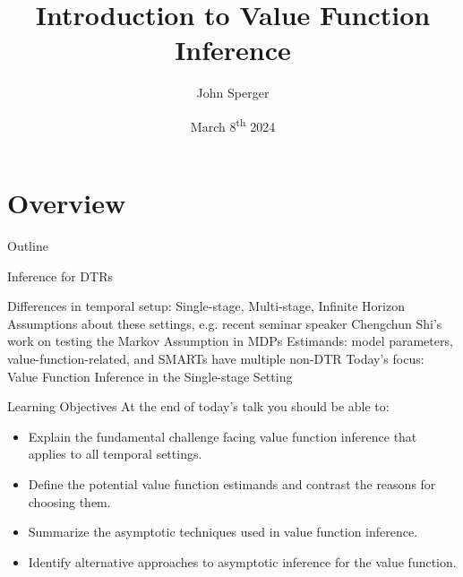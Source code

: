 \documentclass[aspectratio=169, professionalfonts]{beamer}
\author{John Sperger}
\date{March 8\textsuperscript{th} 2024}
\title{Introduction to Value Function Inference}
\begin{document}
\maketitle

\section{Overview}
\begin{frame}{Outline}
	\tableofcontents[hideallsubsections]
\end{frame}

\begin{frame}[label={overview:time}]{Inference for DTRs}

	Differences in temporal setup: Single-stage, Multi-stage, Infinite Horizon
	\vfill
	Assumptions about these settings, e.g. recent seminar speaker Chengchun
	Shi's work on testing the Markov Assumption in MDPs
	\vfill
	Estimands: model parameters, value-function-related, and SMARTs have
	multiple non-DTR
	\vfill \pause
	Today's focus: Value Function Inference in the Single-stage Setting
\end{frame}


\begin{frame}[label={overview:objectives}]{Learning Objectives}
	At the end of today's talk you should be able to:
	\begin{itemize}
		\item Explain the fundamental challenge facing value function inference
		      that applies to all temporal settings.
		\item Define the potential value function estimands and contrast the
		      reasons for choosing them.

		\item Summarize the asymptotic techniques used in value function inference.

		\item Identify alternative approaches to asymptotic inference for the
		      value function.
	\end{itemize}
	\vfill
\end{frame}
\end{document}
